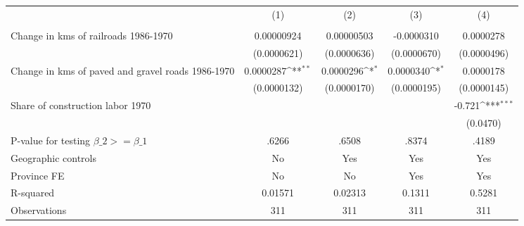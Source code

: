 {
\def\sym#1{\ifmmode^{#1}\else\(^{#1}\)\fi}
\begin{tabular}{l*{4}{c}}
\hline\hline
                &\multicolumn{1}{c}{(1)}&\multicolumn{1}{c}{(2)}&\multicolumn{1}{c}{(3)}&\multicolumn{1}{c}{(4)}\\
                &\multicolumn{1}{c}{}&\multicolumn{1}{c}{}&\multicolumn{1}{c}{}&\multicolumn{1}{c}{}\\
\hline
Change in kms of railroads 1986-1970&0.00000924         &0.00000503         &-0.0000310         &0.0000278         \\
                &(0.0000621)         &(0.0000636)         &(0.0000670)         &(0.0000496)         \\
[1em]
Change in kms of paved and gravel roads 1986-1970&0.0000287\sym{**} &0.0000296\sym{*}  &0.0000340\sym{*}  &0.0000178         \\
                &(0.0000132)         &(0.0000170)         &(0.0000195)         &(0.0000145)         \\
[1em]
Share of construction labor 1970&                  &                  &                  &   -0.721\sym{***}\\
                &                  &                  &                  & (0.0470)         \\
\hline
P-value for testing $\beta\_{2} >= \beta\_{1}$&    .6266         &    .6508         &    .8374         &    .4189         \\
Geographic controls&       No         &      Yes         &      Yes         &      Yes         \\
Province FE     &       No         &       No         &      Yes         &      Yes         \\
R-squared       &  0.01571         &  0.02313         &   0.1311         &   0.5281         \\
Observations    &      311         &      311         &      311         &      311         \\
\hline\hline
\end{tabular}
}

